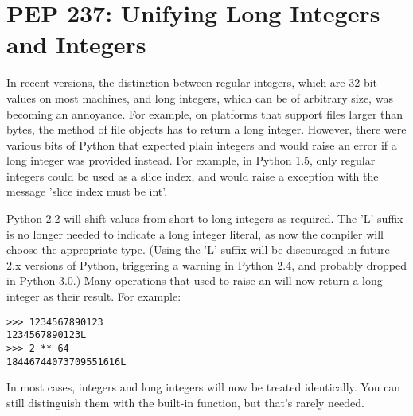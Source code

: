 \documentclass{howto}
\begin{document}
\begin{seealso}


\end{seealso}


\section{PEP 237: Unifying Long Integers and Integers}

In recent versions, the distinction between regular integers, which
are 32-bit values on most machines, and long integers, which can be of
arbitrary size, was becoming an annoyance.  For example, on platforms
that support files larger than  bytes, the
 method of file objects has to return a long integer.
However, there were various bits of Python that expected plain
integers and would raise an error if a long integer was provided
instead.  For example, in Python 1.5, only regular integers
could be used as a slice index, and  would raise a
 exception with the message 'slice index must be
int'.

Python 2.2 will shift values from short to long integers as required.
The 'L' suffix is no longer needed to indicate a long integer literal,
as now the compiler will choose the appropriate type.  (Using the 'L'
suffix will be discouraged in future 2.x versions of Python,
triggering a warning in Python 2.4, and probably dropped in Python
3.0.)  Many operations that used to raise an 
will now return a long integer as their result.  For example:

\begin{verbatim}
>>> 1234567890123
1234567890123L
>>> 2 ** 64
18446744073709551616L
\end{verbatim}

In most cases, integers and long integers will now be treated
identically.  You can still distinguish them with the
 built-in function, but that's rarely needed.  

\begin{seealso}


\end{seealso}
\end{document}
